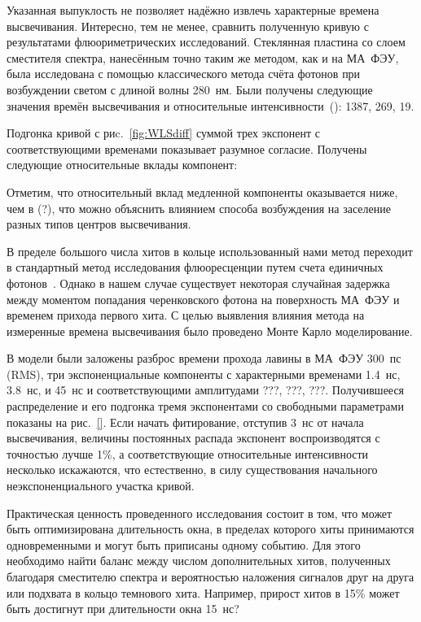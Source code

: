 Указанная выпуклость не позволяет надёжно извлечь характерные времена высвечивания. Интересно, тем не менее, сравнить полученную кривую с результатами флюориметрических исследований. Стеклянная пластина со слоем сместителя спектра, нанесённым точно таким же методом, как и на МА~ФЭУ, была исследована с помощью классического метода счёта фотонов при возбуждении светом с длиной волны 280~нм. Были получены следующие значения времён высвечивания и относительные интенсивности~(\cite{DUERR}): 1387, 269, 19.



Подгонка кривой с риc.~\ref{fig:WLSdiff} суммой трех экспонент с соответствующими временами показывает разумное согласие. Получены следующие относительные вклады компонент: 

Отметим, что относительный вклад медленной компоненты оказывается ниже, чем в (?), что можно объяснить влиянием способа возбуждения на заселение разных типов центров высвечивания.

В пределе большого числа хитов в кольце использованный нами метод переходит в стандартный метод исследования флюоресценции путем счета единичных фотонов~\cite{}. Однако в нашем случае существует некоторая случайная задержка между моментом попадания черенковского фотона на поверхность МА~ФЭУ и временем прихода первого хита. С целью выявления влияния метода на измеренные времена высвечивания было проведено Монте Карло моделирование.

В модели были заложены разброс времени прохода лавины в МА~ФЭУ 300~пс (RMS), три экспоненциальные компоненты с характерными временами 1.4~нс, 3.8~нс, и 45~нс и соответствующими амплитудами ???, ???, ???. Получившееся распределение и его подгонка тремя экспонентами со свободными параметрами показаны на рис.~\ref{}. Если начать фитирование, отступив 3~нс от начала высвечивания, величины постоянных распада экспонент воспроизводятся с точностью лучше 1\%, а соответствующие относительные интенсивности несколько искажаются, что естественно, в силу существования начального неэкспоненциального участка кривой.

Практическая ценность проведенного исследования состоит в том, что может быть оптимизирована длительность окна, в пределах которого хиты принимаются одновременными и могут быть приписаны одному событию. Для этого необходимо найти баланс между числом дополнительных хитов, полученных благодаря сместителю спектра и вероятностью наложения сигналов друг на друга или подхвата в кольцо темнового хита.
Например, прирост хитов в 15\% может быть достигнут при длительности окна 15~нс?
